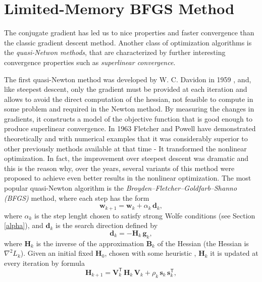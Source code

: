 \section{Limited-Memory BFGS Method}\label{sec:QNM}
The conjugate gradient has led us to nice properties and faster convergence than the classic gradient descent method. Another class of optimization algorithms is the \emph{quasi-Netwon methods}, that are characterized by further interesting convergence properties such as \emph{superlinear convergence}.

The first quasi-Newton method was developed by W. C. Davidon in 1959 \cite{davidon}, and, like steepest descent, only the gradient must be provided at each iteration \cite{Nocedal} and allows to avoid the direct computation of the hessian, not feasible to compute in some problem and required in the Newton method. By measuring the changes in gradients, it constructs a model of the objective function that is good enough to produce superlinear convergence. In 1963 Fletcher and Powell \cite{10.1093/comjnl/6.2.163} have demonstrated theoretically and with numerical examples that it was considerably superior to other previously methods available at that time - It transformed the nonlinear optimization. In fact, the improvement over steepest descent was dramatic and this is the reason why, over the years, several variants of this method were proposed to achieve even better results in the nonlinear optimization. The most popular quasi-Newton algorithm is the \emph{Broyden–Fletcher–Goldfarb–Shanno (BFGS)} method, where each step has the form
\begin{equation}
    \mathbf{w}_{k+1}=\mathbf{w}_k + \alpha_k \, \mathbf{d}_k,
    \label{eq:bfgs_update}
\end{equation}
where $\alpha_k$ is the step lenght chosen to satisfy strong Wolfe conditions (see Section \ref{alpha}), and $\mathbf{d}_k$ is the search direction defined by
\begin{equation}
    \mathbf{d}_k = - \mathbf{H}_k \, \mathbf{g}_k,
    \label{eq:d_bfgs}
\end{equation}
where $\mathbf{H}_k$ is the inverse of the approximation $\mathbf{B}_k$ of the Hessian (the Hessian is $\nabla^2 L_k$). Given an initial fixed $\mathbf{H}_0$, chosen with some heuristic \cite{Nocedal}, $\mathbf{H}_k$ it is updated at every iteration by formula
\begin{equation}
    \mathbf{H}_{k+1}=\mathbf{V}_k^\mathsf{T} \, \mathbf{H}_k \, \mathbf{V}_k + \rho_k \, \mathbf{s}_k \, \mathbf{s}_k^\mathsf{T},
    \label{eq:bfgs_H_update}
\end{equation}
